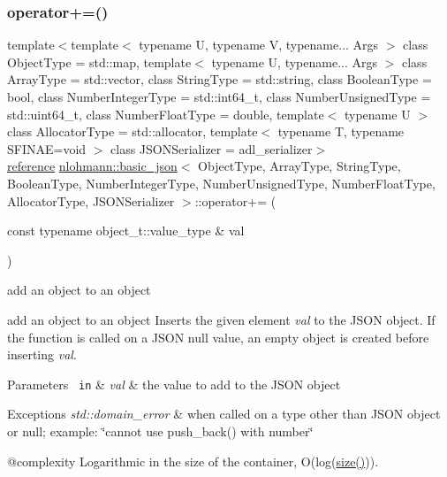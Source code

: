 \subsubsection{\texorpdfstring{operator+=()}{operator+=()}\hspace{0.1cm}{\footnotesize\ttfamily [3/4]}}
{\footnotesize\ttfamily template$<$template$<$ typename U, typename V, typename... Args $>$ class Object\+Type = std\+::map, template$<$ typename U, typename... Args $>$ class Array\+Type = std\+::vector, class String\+Type  = std\+::string, class Boolean\+Type  = bool, class Number\+Integer\+Type  = std\+::int64\+\_\+t, class Number\+Unsigned\+Type  = std\+::uint64\+\_\+t, class Number\+Float\+Type  = double, template$<$ typename U $>$ class Allocator\+Type = std\+::allocator, template$<$ typename T, typename S\+F\+I\+N\+A\+E=void $>$ class J\+S\+O\+N\+Serializer = adl\+\_\+serializer$>$ \\
\mbox{\hyperlink{classnlohmann_1_1basic__json_ac6a5eddd156c776ac75ff54cfe54a5bc}{reference}} \mbox{\hyperlink{classnlohmann_1_1basic__json}{nlohmann\+::basic\+\_\+json}}$<$ Object\+Type, Array\+Type, String\+Type, Boolean\+Type, Number\+Integer\+Type, Number\+Unsigned\+Type, Number\+Float\+Type, Allocator\+Type, J\+S\+O\+N\+Serializer $>$\+::operator+= (\begin{DoxyParamCaption}\item[{const typename object\+\_\+t\+::value\+\_\+type \&}]{val }\end{DoxyParamCaption})\hspace{0.3cm}{\ttfamily [inline]}}



add an object to an object 

add an object to an object Inserts the given element {\itshape val} to the J\+S\+ON object. If the function is called on a J\+S\+ON null value, an empty object is created before inserting {\itshape val}.


\begin{DoxyParams}[1]{Parameters}
\mbox{\texttt{ in}}  & {\em val} & the value to add to the J\+S\+ON object\\
\hline
\end{DoxyParams}

\begin{DoxyExceptions}{Exceptions}
{\em std\+::domain\+\_\+error} & when called on a type other than J\+S\+ON object or null; example\+: {\ttfamily \char`\"{}cannot use push\+\_\+back() with number\char`\"{}}\\
\hline
\end{DoxyExceptions}
@complexity Logarithmic in the size of the container, O(log({\ttfamily \mbox{\hyperlink{classnlohmann_1_1basic__json_a25e27ad0c6d53c01871c5485e1f75b96}{size()}}})).

